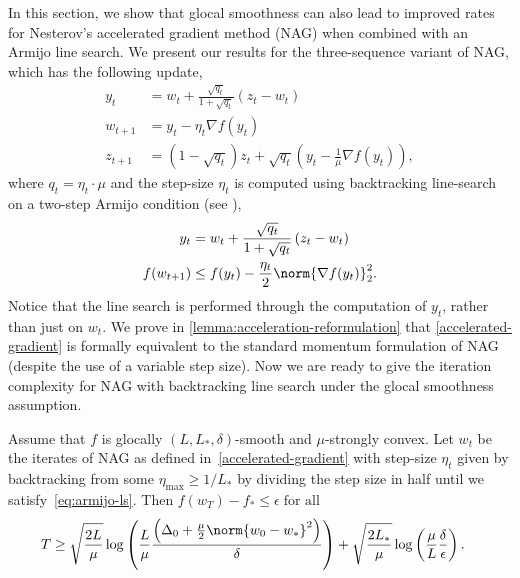 \documentclass[10pt]{article} %
\newcommand{\yk}{y_t}
\newcommand{\zk}{z_t}
\newcommand{\zkk}{z_{t+1}}
\newcommand{\wk}{w_t}
\newcommand{\wkk}{w_{t+1}}
\newcommand{\etak}{\eta_{t}}
\newcommand{\grad}{\nabla{} f}
\newcommand{\rbr}[1]{\left(#1\right)}
\begin{document}
In this section, we show that glocal smoothness can also lead to improved rates
for Nesterov's accelerated gradient method (NAG) when combined with an Armijo
line search.
We present our results for the three-sequence variant of NAG,
which has the following update,
\begin{equation}
    \begin{aligned}\label{accelerated-gradient}
        \yk
         & = \wk + \frac{\sqrt{q_t}}{1 + \sqrt{q_t}}\rbr{\zk - \wk}              \\
        \wkk
         & = \yk - \etak \grad(\yk)                                              \\
        \zkk
         & = (1 - \sqrt{q_t}) \zk + \sqrt{q_t} (\yk - \frac{1}{\mu} \grad(\yk)),
    \end{aligned}
\end{equation}
where \( q_t = \eta_t \cdot \mu \) and the step-size \( \eta_t \) is computed
using backtracking line-search on a two-step Armijo condition (see \cite[Eq. 2.2.7]{nesterov2018lectures}),
\begin{equation}\label{eq:armijo-ls}
    \begin{aligned}
        \yk        & = \wk + \frac{\sqrt{q_t}}{1 + \sqrt{q_t}}\rbr{\zk - \wk} \\
        f(w_{t+1}) & \leq f(y_t) - \frac{\eta_t}{2}\norm{\nabla f(y_t)}_2^2.
    \end{aligned}
\end{equation}
Notice that the line search is performed through the computation of $y_{t}$,
rather than just on \( \wk \).
We prove in \cref{lemma:acceleration-reformulation} that
\cref{accelerated-gradient} is formally equivalent to the standard
momentum formulation of NAG (despite the use of a variable step size).
Now we are ready to give the iteration complexity for NAG with backtracking line search under the glocal smoothness assumption.
\begin{theorem}
    \label{acceleration-theorem}
    Assume that $f$ is glocally $(L, L_*, \delta)$-smooth and $\mu$-strongly
    convex.
    Let $w_t$ be the iterates of NAG as defined in~\eqref{accelerated-gradient}
    with step-size $\eta_t$ given by backtracking from some $\eta_\text{max} \geq 1/L_*$ by dividing the step size in half until we satisfy~\eqref{eq:armijo-ls}.
    Then $f(w_T) - f_* \leq \epsilon \;\text{for all}$
    \[
        \begin{aligned}
            T & \geq
            \sqrt{\frac{2L}{\mu}}\log\rbr{\frac{L}{\mu}\frac{\rbr{\Delta_{0} + \frac{\mu}{2}\norm{w_0 - w_*}^2}}{\delta}} +
            \sqrt{\frac{2L_*}{\mu}}\log\rbr{\frac{\mu}{L}\frac{\delta}{\epsilon}}.
        \end{aligned}
    \]
\end{theorem}
\end{document}

